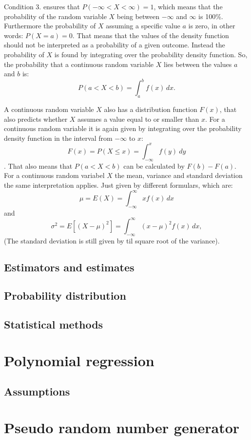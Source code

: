 \documentclass{article}
\begin{document}
	Condition 3. ensures that $P(-\infty < X < \infty) = 1$, which means that the probability of the random variable $X$ being between $-\infty$ and $\infty$ is 100\%. Furthermore the probability of $X$ assuming a specific value $a$ is zero, in other words: $P(X=a)=0$. That means that the values of the density function should not be interpreted as a probability of a given outcome. Instead the probability of $X$ is found by integrating over the probability density function. So, the probability that a continuous random variable $X$ lies between the values $a$ and $b$ is: 
	$$P(a < X < b) = \int_a^b f(x) \, dx.$$
	
	A continuous random variable $X$ also has a distribution function $F(x)$, that also predicts whether $X$ assumes a value equal to or smaller than $x$. For a continuous random variable it is again given by integrating over the probability density function in the interval from $-\infty$ to $x$:
	$$F(x) = P(X \leq x) = \int_{-\infty}^{x} f(y) \ dy$$.
	That also means that $P(a<X<b)$ can be calculated by $F(b)-F(a)$.
	\\
	
	For a continuous random variabel $X$ the mean, variance and standard deviation the same interpretation applies. Just given by different formulars, which are:
	$$\mu = E(X) = \int_{-\infty}^{\infty} x f(x) \, dx$$
	and
	$$\sigma^2 = E\left[(X - \mu)^2\right] = \int_{-\infty}^{\infty} (x - \mu)^2 f(x) \, dx,$$
	(The standard deviation is still given by til square root of the variance).
	
	
	\subsection{Estimators and estimates}
	\subsection{Probability distribution}
	\subsection{Statistical methods}
	\newpage
	\section{Polynomial regression}
	\subsection{Assumptions}
	\newpage
	\section{Pseudo random number generator}
	\newpage
\end{document}
